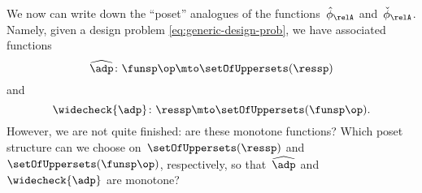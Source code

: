 We now can write down the ``poset'' analogues of the functions~$\hat \phi_{\relA}$ and~$\check \phi_{\relA}$.
Namely, given a design problem \cref{eq:generic-design-prob}, we have associated functions
\begin{equation}
    \label{eq:dp-left-curry}
    \widehat{\adp} \colon \funsp\op \mto \setOfUppersets (\ressp)
\end{equation}
and
\begin{equation}
    \label{eq:dp-right-curry}
    \widecheck{\adp} \colon \ressp \mto \setOfUppersets (\funsp\op).
\end{equation}
However, we are not quite finished: are these monotone functions?
Which poset structure can we choose on~$\setOfUppersets (\ressp)$ and~$\setOfUppersets (\funsp\op)$, respectively, so that~$\widehat{\adp}$ and~$\widecheck{\adp}$ are monotone?

